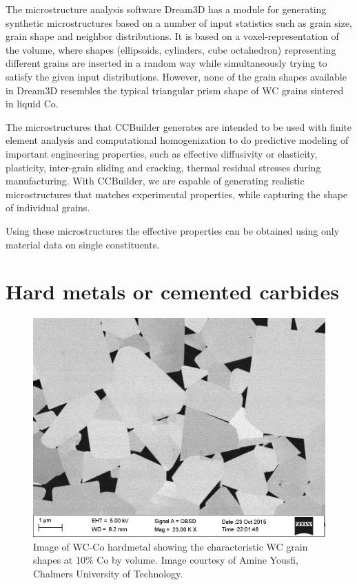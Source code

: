 \documentclass[3p,12pt]{elsarticle}
\begin{document}
The microstructure analysis software Dream3D \cite{groeber_dream.3d:_2014} has a module for generating synthetic microstructures based on a number of input statistics such as grain size, grain shape and neighbor distributions.
It is based on a voxel-representation of the volume, where shapes (ellipsoids, cylinders, cube octahedron) representing different grains are inserted in a random way while simultaneously trying to satisfy the given input distributions.
However, none of the grain shapes available in Dream3D resembles the typical triangular prism shape of WC grains sintered in liquid Co.


The microstructures that CCBuilder generates are intended to be used with finite element analysis and computational homogenization to do predictive modeling of important engineering properties, such as effective diffusivity or elasticity, plasticity, inter-grain sliding and cracking, thermal residual stresses during manufacturing.
With CCBuilder, we are capable of generating realistic microstructures that matches experimental properties, while capturing the shape of individual grains.

Using these microstructures the effective properties can be obtained using only material data on single constituents.


\section{Hard metals or cemented carbides}

\begin{figure}[htbp!]
\centering
\includegraphics[width=0.5\linewidth]{wc_co_example}
\caption{Image of WC-Co hardmetal showing the characteristic WC grain shapes at 10\% Co by volume. Image courtesy of Amine Yousfi, Chalmers University of Technology.} \label{fig:wc-co_hardmetal}
\end{figure}
\end{document}
